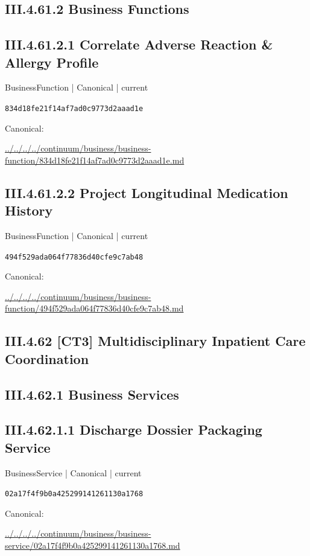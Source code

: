 \documentclass[10pt,a4paper]{article}
\begin{document}
\subsection*{III.4.61.2 Business Functions}
\subsection*{III.4.61.2.1 Correlate Adverse Reaction \& Allergy Profile}
{\small BusinessFunction | Canonical | current}\par
\texttt{834d18fe21f14af7ad0c9773d2aaad1e}\par
Canonical: \par
{\footnotesize\url{../../../../continuum/business/business-function/834d18fe21f14af7ad0c9773d2aaad1e.md}}\par
\subsection*{III.4.61.2.2 Project Longitudinal Medication History}
{\small BusinessFunction | Canonical | current}\par
\texttt{494f529ada064f77836d40cfe9c7ab48}\par
Canonical: \par
{\footnotesize\url{../../../../continuum/business/business-function/494f529ada064f77836d40cfe9c7ab48.md}}\par
\subsection*{III.4.62 [CT3] Multidisciplinary Inpatient Care Coordination}
\subsection*{III.4.62.1 Business Services}
\subsection*{III.4.62.1.1 Discharge Dossier Packaging Service}
{\small BusinessService | Canonical | current}\par
\texttt{02a17f4f9b0a425299141261130a1768}\par
Canonical: \par
{\footnotesize\url{../../../../continuum/business/business-service/02a17f4f9b0a425299141261130a1768.md}}\par
\end{document}
